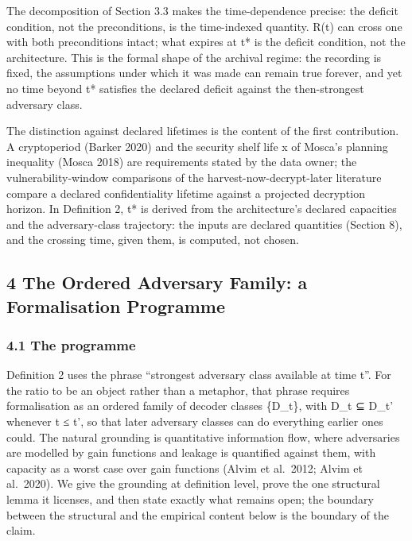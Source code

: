 \documentclass[
]{llncs}
\begin{document}
The decomposition of Section 3.3 makes the time-dependence precise: the
deficit condition, not the preconditions, is the time-indexed quantity.
R(t) can cross one with both preconditions intact; what expires at t* is
the deficit condition, not the architecture. This is the formal shape of
the archival regime: the recording is fixed, the assumptions under which
it was made can remain true forever, and yet no time beyond t* satisfies
the declared deficit against the then-strongest adversary class.

The distinction against declared lifetimes is the content of the first
contribution. A cryptoperiod (Barker 2020) and the security shelf life x
of Mosca's planning inequality (Mosca 2018) are requirements stated by
the data owner; the vulnerability-window comparisons of the
harvest-now-decrypt-later literature compare a declared confidentiality
lifetime against a projected decryption horizon. In Definition 2, t* is
derived from the architecture's declared capacities and the
adversary-class trajectory: the inputs are declared quantities (Section
8), and the crossing time, given them, is computed, not chosen.

\subsection{4 The Ordered Adversary Family: a Formalisation
Programme}\label{the-ordered-adversary-family-a-formalisation-programme}

\subsubsection{4.1 The programme}\label{the-programme}

Definition 2 uses the phrase ``strongest adversary class available at
time t''. For the ratio to be an object rather than a metaphor, that
phrase requires formalisation as an ordered family of decoder classes
\{D\_t\}, with D\_t ⊆ D\_t' whenever t ≤ t', so that later adversary
classes can do everything earlier ones could. The natural grounding is
quantitative information flow, where adversaries are modelled by gain
functions and leakage is quantified against them, with capacity as a
worst case over gain functions (Alvim et al.~2012; Alvim et al.~2020).
We give the grounding at definition level, prove the one structural
lemma it licenses, and then state exactly what remains open; the
boundary between the structural and the empirical content below is the
boundary of the claim.
\end{document}
